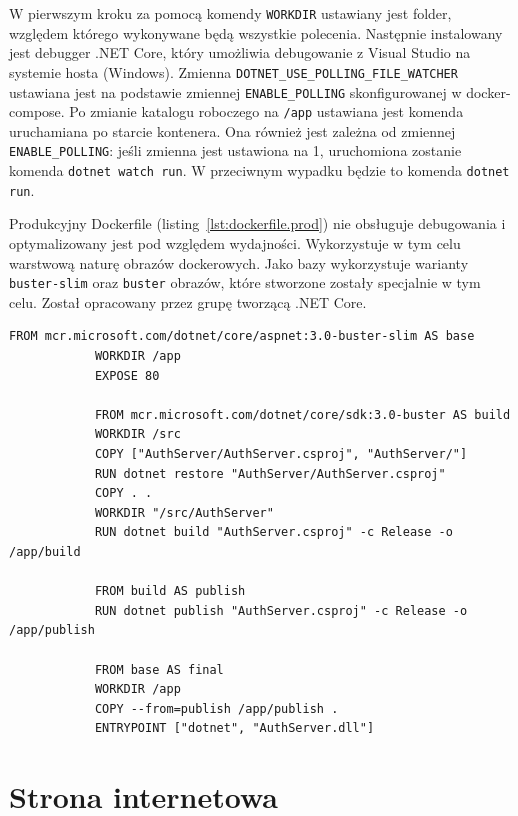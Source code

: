		W pierwszym kroku za pomocą komendy \verb|WORKDIR| ustawiany jest folder, względem którego wykonywane będą wszystkie polecenia.
		Następnie instalowany jest debugger .NET Core, który umożliwia debugowanie z Visual Studio na systemie hosta (Windows).
		Zmienna \verb|DOTNET_USE_POLLING_FILE_WATCHER| ustawiana jest na podstawie zmiennej \verb|ENABLE_POLLING| skonfigurowanej w docker-compose.
		Po zmianie katalogu roboczego na \verb|/app| ustawiana jest komenda uruchamiana po starcie kontenera.
		Ona również jest zależna od zmiennej \verb|ENABLE_POLLING|: jeśli zmienna jest ustawiona na 1, uruchomiona zostanie komenda \verb|dotnet watch run|.
		W przeciwnym wypadku będzie to komenda \verb|dotnet run|.

		Produkcyjny Dockerfile (listing~\ref{lst:dockerfile.prod}) nie obsługuje debugowania i optymalizowany jest pod względem wydajności.
		Wykorzystuje w tym celu warstwową naturę obrazów dockerowych.
		Jako bazy wykorzystuje warianty \verb|buster-slim| oraz \verb|buster| obrazów,
		które stworzone zostały specjalnie w tym celu.
		Został opracowany przez grupę tworzącą .NET Core.

		\begin{lstlisting}[label=lst:dockerfile.prod,caption=Plik Dockerfile budowany warstwowo]
			FROM mcr.microsoft.com/dotnet/core/aspnet:3.0-buster-slim AS base
			WORKDIR /app
			EXPOSE 80
			
			FROM mcr.microsoft.com/dotnet/core/sdk:3.0-buster AS build
			WORKDIR /src
			COPY ["AuthServer/AuthServer.csproj", "AuthServer/"]
			RUN dotnet restore "AuthServer/AuthServer.csproj"
			COPY . .
			WORKDIR "/src/AuthServer"
			RUN dotnet build "AuthServer.csproj" -c Release -o /app/build
			
			FROM build AS publish
			RUN dotnet publish "AuthServer.csproj" -c Release -o /app/publish
			
			FROM base AS final
			WORKDIR /app
			COPY --from=publish /app/publish .
			ENTRYPOINT ["dotnet", "AuthServer.dll"]		
		\end{lstlisting}

\section{Strona internetowa}
